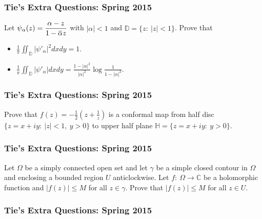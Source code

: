 \hypertarget{ties-extra-questions-spring-2015-22}{%
\subsubsection{Tie's Extra Questions: Spring
2015}\label{ties-extra-questions-spring-2015-22}}

Let
\(\displaystyle{\psi_{\alpha}(z)=\frac{\alpha-z}{1-\mkern 1.5mu\overline{\mkern-1.5mu\alpha\mkern-1.5mu}\mkern 1.5muz}}\)
with \(|\alpha|<1\) and \({\mathbb D}=\{z:\ |z|<1\}\). Prove that

\begin{itemize}
\item
  \(\displaystyle{\frac{1}{\pi}\iint_{{\mathbb D}} |\psi'_{\alpha}|^2 dx dy =1}\).
\item
  \(\displaystyle{\frac{1}{\pi}\iint_{{\mathbb D}} |\psi'_{\alpha}| dx dy =\frac{1-|\alpha|^2}{|\alpha|^2} \log \frac{1}{1-|\alpha|^2}}\).
\end{itemize}

\hypertarget{ties-extra-questions-spring-2015-23}{%
\subsubsection{Tie's Extra Questions: Spring
2015}\label{ties-extra-questions-spring-2015-23}}

Prove that
\(\displaystyle{f(z)=-\frac{1}{2}\left(z+\frac{1}{z}\right)}\) is a
conformal map from half disc \(\{z=x+iy:\ |z|<1,\ y>0\}\) to upper half
plane \({\mathbb H}=\{z=x+iy:\ y>0\}\).

\hypertarget{ties-extra-questions-spring-2015-24}{%
\subsubsection{Tie's Extra Questions: Spring
2015}\label{ties-extra-questions-spring-2015-24}}

Let \(\Omega\) be a simply connected open set and let \(\gamma\) be a
simple closed contour in \(\Omega\) and enclosing a bounded region \(U\)
anticlockwise. Let \(f: \ \Omega \to {\mathbb C}\) be a holomorphic
function and \(|f(z)|\leq M\) for all \(z\in \gamma\). Prove that
\(|f(z)|\leq M\) for all \(z\in U\).

\hypertarget{ties-extra-questions-spring-2015-25}{%
\subsubsection{Tie's Extra Questions: Spring
2015}\label{ties-extra-questions-spring-2015-25}}

